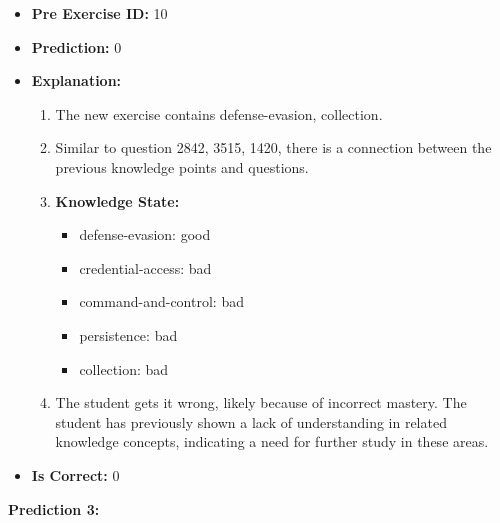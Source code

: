 \begin{figure*}[t]
\begin{tcolorbox}[
    sharpish corners,
    boxrule = 0pt,
    toprule = 0pt,
    enhanced
]
\begin{itemize}[nolistsep, leftmargin=*]
    \item \textbf{Pre Exercise ID:} 10
    \item \textbf{Prediction:} 0
    \item \textbf{Explanation:}  
    \begin{enumerate}
        \item The new exercise contains defense-evasion, collection.
        \item Similar to question 2842, 3515, 1420, there is a connection between the previous knowledge points and questions.
        \item \textbf{Knowledge State:}  
        \begin{itemize}[nolistsep, leftmargin=*]
            \item defense-evasion: good
            \item credential-access: bad
            \item command-and-control: bad
            \item persistence: bad
            \item collection: bad
        \end{itemize}
        \item The student gets it wrong, likely because of incorrect mastery. The student has previously shown a lack of understanding in related knowledge concepts, indicating a need for further study in these areas.
    \end{enumerate}
    \item \textbf{Is Correct:} 0
\end{itemize}

\textbf{Prediction 3:}  


\end{tcolorbox}
\end{figure*}
